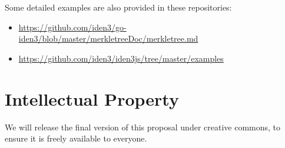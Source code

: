 \documentclass[11pt]{article}
\begin{document}
Some detailed examples are also provided in these repositories:
\begin{itemize}
	\item\url{https://github.com/iden3/go-iden3/blob/master/merkletreeDoc/merkletree.md}
	\item\url{https://github.com/iden3/iden3js/tree/master/examples}
\end{itemize}

%
%
%
	
\section {Intellectual Property}	
We will release the final version of this proposal under creative commons, to ensure it is freely available to everyone.

{}


\end{document}
